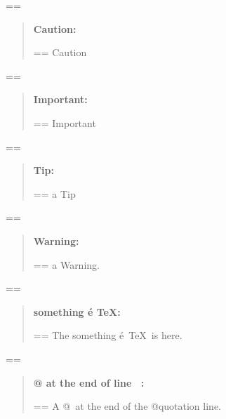 \documentclass{book}
\makeatletter
\newenvironment{Texinfopreformatted}{%
  \par\GNUTobeylines\obeyspaces\frenchspacing\parskip=\z@\parindent=\z@}{}
{\catcode`\^^M=13 \gdef\GNUTobeylines{\catcode`\^^M=13 \def^^M{\null\par}}}
\newenvironment{Texinfoindented}{\begin{list}{}{}\item\relax}{\end{list}}
\renewcommand{\_}{\Texinfounderscore\discretionary{}{}{}}
\makeatother
\begin{document}
\begin{Texinfoindented}
\begin{quote}
\end{quote}
\begin{Texinfopreformatted}%
\ttfamily 
\end{Texinfopreformatted}
\begin{quote}
\textbf{Caution:} \begin{Texinfopreformatted}%
\ttfamily Caution
\end{Texinfopreformatted}
\end{quote}
\begin{Texinfopreformatted}%
\ttfamily 
\end{Texinfopreformatted}
\begin{quote}
\textbf{Important:} \begin{Texinfopreformatted}%
\ttfamily Important
\end{Texinfopreformatted}
\end{quote}
\begin{Texinfopreformatted}%
\ttfamily 
\end{Texinfopreformatted}
\begin{quote}
\textbf{Tip:} \begin{Texinfopreformatted}%
\ttfamily a Tip
\end{Texinfopreformatted}
\end{quote}
\begin{Texinfopreformatted}%
\ttfamily 
\end{Texinfopreformatted}
\begin{quote}
\textbf{Warning:} \begin{Texinfopreformatted}%
\ttfamily a Warning.
\end{Texinfopreformatted}
\end{quote}
\begin{Texinfopreformatted}%
\ttfamily 
\end{Texinfopreformatted}
\begin{quote}
\textbf{something \'{e} \TeX{}:} \begin{Texinfopreformatted}%
\ttfamily The something \'{e}\ \TeX{}\ is here.
\end{Texinfopreformatted}
\end{quote}
\begin{Texinfopreformatted}%
\ttfamily 
\end{Texinfopreformatted}
\begin{quote}
\textbf{@ at the end of line \ {}:} \begin{Texinfopreformatted}%
\ttfamily A @\ at the end of the @quotation line.
\end{Texinfopreformatted}

\end{quote}
\end{Texinfoindented}
\end{document}
